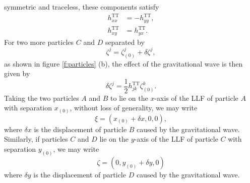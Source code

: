 symmetric and traceless, these components satisfy
\begin{align}
h_{xx}^\mathrm{TT} &= - h_{yy}^\mathrm{TT}, \\
h_{xy}^\mathrm{TT} &= h_{yx}^\mathrm{TT}.
\end{align}
For two more particles $C$ and $D$ separated by
\begin{equation}
\zeta^j = \zeta^j_{(0)} + \delta \zeta^j,
\end{equation}
as shown in figure \ref{f:particles} (b), the effect of the gravitational wave
is then given by 
\begin{equation}
\delta \zeta^j = \frac{1}{2} h_{jk}^\mathrm{TT} \zeta_{(0)}^k.
\label{eq:gwyeffect}
\end{equation}
Taking the two particles $A$ and $B$ to lie on the $x$-axis of the LLF of
particle $A$ with separation $x_{(0)}$, without loss of generality, we may
write
\begin{equation}
\xi = (x_{(0)} + \delta x,0,0),
\label{eq:gwxcoord}
\end{equation}
where $\delta x$ is the displacement of particle $B$ caused by the
gravitational wave. Similarly, if particles $C$ and $D$ lie on the $y$-axis of
the LLF of particle $C$ with separation $y_{(0)}$, we may write
\begin{equation}
\zeta = (0,y_{(0)} + \delta y,0)
\label{eq:gwycoord}
\end{equation}
where $\delta y$ is the displacement of particle $D$ caused by the
gravitational wave. 

